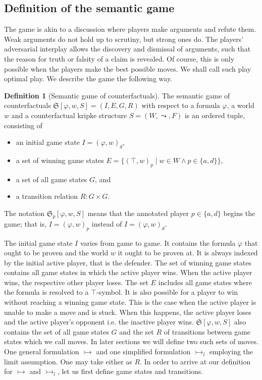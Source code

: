 \documentclass[a4paper,american]{paper}
\theoremstyle{definition}\newtheorem{definition}{Definition}
\begin{document}
\subsection{Definition of the semantic game}
The game is akin to a discussion where players make arguments and refute them. Weak arguments do not hold up to scrutiny, but strong ones do. The players' adversarial interplay allows the discovery and dismissal of arguments, such that the reason for truth or falsity of a claim is revealed. Of course, this is only possible when the players make the best possible moves. We shall call such play optimal play. We describe the game the following way.
\begin{definition}[Semantic game of counterfactuals]
The semantic game of counterfactuals $\mathfrak{S}[\varphi ,w,S]=(I, E, G, R)$ with respect to a formula $\varphi$, a world $w$ and a counterfactual kripke structure $S=(W,\leadsto ,F)$ is an ordered tuple, consisting of
\begin{itemize}
\item an initial game state $I=(\varphi ,w)_d$,
\item a set of winning game states $E=\{(\top ,w)_p \mid w\in W\wedge p\in\{ a,d\}\}$,
\item a set of all game states $G$, and
\item a transition relation $R: G\times G$.
\end{itemize}
The notation $\mathfrak{S}_p[\varphi ,w,S]$ means that the annotated player $p\in\{a,d\}$ begins the game; that is, $I=(\varphi ,w)_p$ instead of $I=(\varphi ,w)_d$.
\end{definition}
The initial game state $I$ varies from game to game. It contains the formula $\varphi$ that ought to be proven and the world $w$ it ought to be proven at. It is always indexed by the initial active player, that is the defender. The set of winning game states contains all game states in which the active player wins. When the active player wins, the respective other player loses. The set $E$ includes all game states where the formula is resolved to a $\top$-symbol. It is also possible for a player to win without reaching a winning game state. This is the case when the active player is unable to make a move and is stuck. When this happens, the active player loses and the active player's opponent i.e. the inactive player wins. $\mathfrak{S}[\varphi ,w,S]$ also contains the set of all game states $G$ and the set $R$ of transitions between game states which we call moves. In later sections we will define two such sets of moves. One general formulation $\rightarrowtail$ and one simplified formulation $\rightarrowtail_l$ employing the limit assumption. One may take either as $R$. In order to arrive at our definition for $\rightarrowtail$ and $\rightarrowtail_l$, let us first define game states and transitions.
\end{document}
